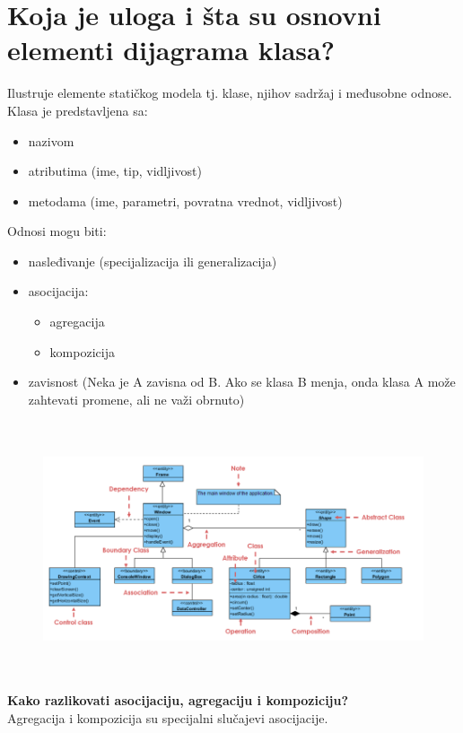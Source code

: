 \documentclass[a4paper]{article}
\begin{document}
\section{Koja je uloga i šta su osnovni elementi dijagrama klasa?}
  Ilustruje elemente statičkog modela tj. klase, njihov sadržaj i međusobne odnose.
  Klasa je predstavljena sa:
  \begin{itemize}
    \item nazivom
    \item atributima (ime, tip, vidljivost)
    \item metodama (ime, parametri, povratna vrednot, vidljivost)
  \end{itemize}
  Odnosi mogu biti:
  \begin{itemize}
    \item nasleđivanje (specijalizacija ili generalizacija)
    \item asocijacija:
          \begin{itemize}
            \item agregacija
            \item kompozicija
          \end{itemize}
    \item zavisnost (Neka je A zavisna od B. Ako se klasa B menja, onda klasa A može zahtevati promene,
          ali ne važi obrnuto)
  \end{itemize}
  \begin{figure}[H]
    \begin{center}
        \includegraphics[width=120mm,height=75mm]{Slike/uml_klase.png}
    \end{center}
  \end{figure} 
  \textbf{Kako razlikovati asocijaciju, agregaciju i kompoziciju?}\\
  \indent Agregacija i kompozicija su specijalni slučajevi asocijacije. 
\end{document}
